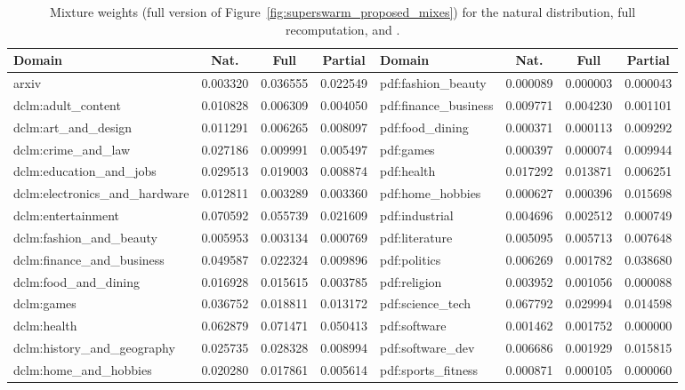 \begin{table}[t]
\centering
\caption{Mixture weights (full version of Figure~\ref{fig:superswarm_proposed_mixes}) for the natural distribution, full recomputation, and \partialmixreuse.}
\scriptsize
\setlength{\tabcolsep}{4pt}
\begin{tabular}{lccc | lccc}
\toprule
\textbf{Domain} & \textbf{Nat.} & \textbf{Full} & \textbf{Partial} & \textbf{Domain} & \textbf{Nat.} & \textbf{Full} & \textbf{Partial} \\
\midrule
arxiv & 0.003320 & 0.036555 & 0.022549 & pdf:fashion\_beauty & 0.000089 & 0.000003 & 0.000043 \\
dclm:adult\_content & 0.010828 & 0.006309 & 0.004050 & pdf:finance\_business & 0.009771 & 0.004230 & 0.001101 \\
dclm:art\_and\_design & 0.011291 & 0.006265 & 0.008097 & pdf:food\_dining & 0.000371 & 0.000113 & 0.009292 \\
dclm:crime\_and\_law & 0.027186 & 0.009991 & 0.005497 & pdf:games & 0.000397 & 0.000074 & 0.009944 \\
dclm:education\_and\_jobs & 0.029513 & 0.019003 & 0.008874 & pdf:health & 0.017292 & 0.013871 & 0.006251 \\
dclm:electronics\_and\_hardware & 0.012811 & 0.003289 & 0.003360 & pdf:home\_hobbies & 0.000627 & 0.000396 & 0.015698 \\
dclm:entertainment & 0.070592 & 0.055739 & 0.021609 & pdf:industrial & 0.004696 & 0.002512 & 0.000749 \\
dclm:fashion\_and\_beauty & 0.005953 & 0.003134 & 0.000769 & pdf:literature & 0.005095 & 0.005713 & 0.007648 \\
dclm:finance\_and\_business & 0.049587 & 0.022324 & 0.009896 & pdf:politics & 0.006269 & 0.001782 & 0.038680 \\
dclm:food\_and\_dining & 0.016928 & 0.015615 & 0.003785 & pdf:religion & 0.003952 & 0.001056 & 0.000088 \\
dclm:games & 0.036752 & 0.018811 & 0.013172 & pdf:science\_tech & 0.067792 & 0.029994 & 0.014598 \\
dclm:health & 0.062879 & 0.071471 & 0.050413 & pdf:software & 0.001462 & 0.001752 & 0.000000 \\
dclm:history\_and\_geography & 0.025735 & 0.028328 & 0.008994 & pdf:software\_dev & 0.006686 & 0.001929 & 0.015815 \\
dclm:home\_and\_hobbies & 0.020280 & 0.017861 & 0.005614 & pdf:sports\_fitness & 0.000871 & 0.000105 & 0.000060 \\

\end{tabular}
\end{table}
